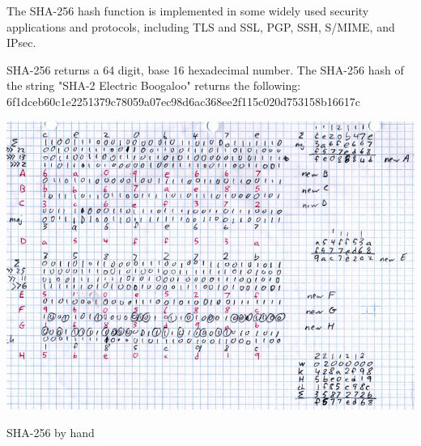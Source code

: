 \documentclass{tufte-handout}
\begin{document}
The SHA-256 hash function is implemented in some widely used security applications and protocols, including TLS and SSL, PGP, SSH, S/MIME, and IPsec.

SHA-256 returns a 64 digit, base 16 hexadecimal number.   The SHA-256 hash of the string "SHA-2 Electric Boogaloo" returns the following:\\
\vspace{0.5cm}
\noindent6f1dceb60c1e2251379c78059a07ec98d6ac368ee2f115c020d753158b16617c

\begin{marginfigure}[-110 pt]%
  \includegraphics[width=\linewidth]{sha.jpg}
  \caption{SHA-256 by hand}
  \label{fig:marginfig}
\end{marginfigure}
\end{document}
